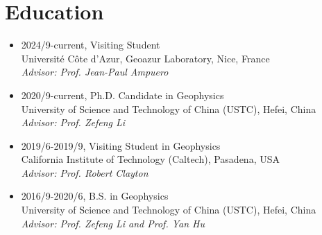 \section{Education}
\begin{itemize}

  \item 2024/9-current, Visiting Student \\
  Université Côte d'Azur, Geoazur Laboratory, Nice, France \\
  \textit{Advisor: Prof. Jean-Paul Ampuero}

  \item 2020/9-current, Ph.D. Candidate in Geophysics \\
        University of Science and Technology of China (USTC), Hefei, China \\
        \textit{Advisor: Prof. Zefeng Li}
  
  \item 2019/6-2019/9, Visiting Student in Geophysics \\
        California Institute of Technology (Caltech), Pasadena, USA \\
        \textit{Advisor: Prof. Robert Clayton}
  
  \item 2016/9-2020/6, B.S. in Geophysics \\
        University of Science and Technology of China (USTC), Hefei, China \\
        \textit{Advisor: Prof. Zefeng Li and Prof. Yan Hu}
\end{itemize}